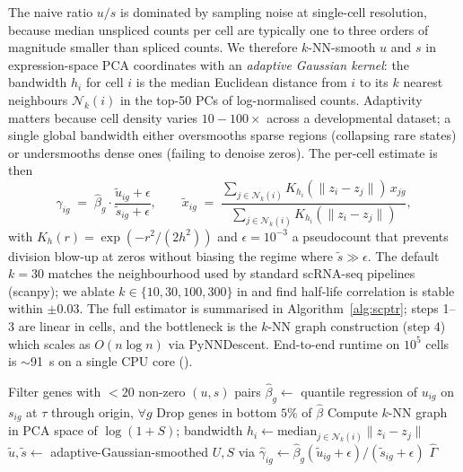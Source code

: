 \documentclass{article}
\begin{document}
The naive ratio $u/s$ is dominated by sampling noise at single-cell
resolution, because median unspliced counts per cell are typically one to
three orders of magnitude smaller than spliced counts. We therefore
$k$-NN-smooth $u$ and $s$ in expression-space PCA coordinates with an
\emph{adaptive Gaussian kernel}: the bandwidth $h_i$ for cell $i$ is the
median Euclidean distance from $i$ to its $k$ nearest neighbours
$\mathcal N_k(i)$ in the top-50 PCs of log-normalised counts. Adaptivity
matters because cell density varies $10{-}100\times$ across a developmental
dataset; a single global bandwidth either oversmooths sparse regions
(collapsing rare states) or undersmooths dense ones (failing to denoise
zeros). The per-cell estimate is then
\begin{equation}
  \widehat\gamma_{ig} \;=\; \widehat\beta_g \cdot
  \frac{\widetilde u_{ig} + \epsilon}{\widetilde s_{ig} + \epsilon},
  \qquad
  \widetilde x_{ig} \;=\; \frac{\sum_{j\in\mathcal N_k(i)}
    K_{h_i}\!(\|z_i{-}z_j\|)\, x_{jg}}{\sum_{j\in\mathcal N_k(i)}
    K_{h_i}\!(\|z_i{-}z_j\|)},
  \label{eq:gamma}
\end{equation}
with $K_h(r) {=} \exp(-r^2/(2h^2))$ and $\epsilon{=}10^{-3}$ a pseudocount
that prevents division blow-up at zeros without biasing the regime where
$\widetilde s {\gg} \epsilon$. The default $k{=}30$ matches the
neighbourhood used by standard scRNA-seq pipelines (scanpy); we ablate
$k\in\{10,30,100,300\}$ in  and find half-life
correlation is stable within $\pm 0.03$. The full estimator is summarised
in Algorithm~\ref{alg:scptr}; steps 1--3 are linear in cells, and the
bottleneck is the $k$-NN graph construction (step 4) which scales as
$O(n\log n)$ via PyNNDescent. End-to-end runtime on $10^5$ cells is
$\sim$91~s on a single CPU core ().

\begin{algorithm}[t]
  \caption{scPTR: per-cell mRNA degradation rate estimation.}
  \label{alg:scptr}
  \small
  \BlankLine
  Filter genes with $<20$ non-zero $(u,s)$ pairs\;
  $\widehat\beta_g \leftarrow$ quantile regression of $u_{ig}$ on $s_{ig}$ at $\tau$ through origin, $\forall g$\;
  Drop genes in bottom $5\%$ of $\widehat\beta$\;
  Compute $k$-NN graph in PCA space of $\log(1{+}S)$; bandwidth $h_i \leftarrow \mathrm{median}_{j\in\mathcal N_k(i)} \|z_i{-}z_j\|$\;
  $\widetilde u, \widetilde s \leftarrow$ adaptive-Gaussian-smoothed $U, S$ via \;
  $\widehat\gamma_{ig} \leftarrow \widehat\beta_g (\widetilde u_{ig}{+}\epsilon)/(\widetilde s_{ig}{+}\epsilon)$\;
  \Return $\widehat\Gamma$\;
\end{algorithm}
\end{document}
